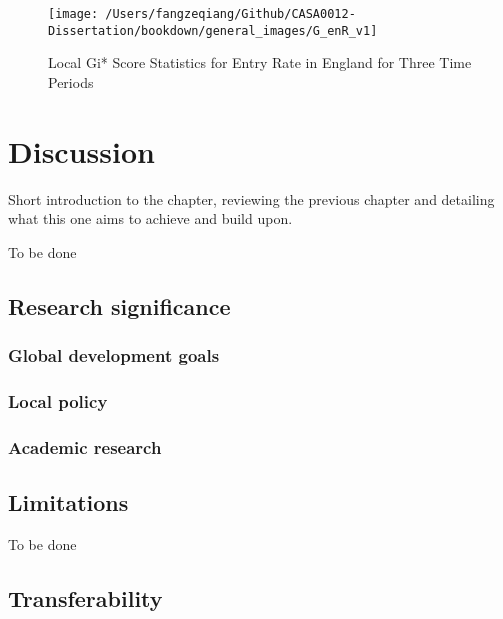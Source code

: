 \documentclass[
  12pt,
  oneside]{book}
\begin{document}
\begin{figure}
\texttt{[image: /Users/fangzeqiang/Github/CASA0012-Dissertation/bookdown/general\_images/G\_enR\_v1]} \caption{Local Gi* Score Statistics for Entry Rate in England for Three Time Periods}\label{fig:fig-Gi-entry-rate}
\end{figure}

\hypertarget{disc}{%
\chapter{Discussion}\label{disc}}

Short introduction to the chapter, reviewing the previous chapter and detailing what this one aims to achieve and build upon.

To be done

\hypertarget{research-significance}{%
\section{Research significance}\label{research-significance}}

\hypertarget{global-development-goals}{%
\subsection{Global development goals}\label{global-development-goals}}

\hypertarget{local-policy}{%
\subsection{Local policy}\label{local-policy}}

\hypertarget{academic-research}{%
\subsection{Academic research}\label{academic-research}}

\hypertarget{limitations-1}{%
\section{Limitations}\label{limitations-1}}

To be done

\hypertarget{transferability}{%
\section{Transferability}\label{transferability}}
\end{document}
